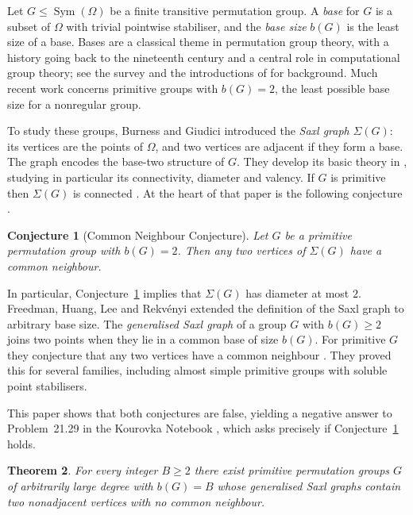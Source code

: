 \documentclass[a4paper,reqno,11pt]{amsart}
\newcommand\Symgrp{\operatorname{Sym}}
\newtheorem{thm}{Theorem}[section]
\newtheorem{conj}[thm]{Conjecture}
\numberwithin{equation}{section}
\begin{document}
Let $G\le\Symgrp(\Omega)$ be a finite transitive permutation group. A \emph{base} for $G$ is a subset of $\Omega$ with trivial pointwise stabiliser, and the \emph{base size} $b(G)$ is the least size of a base. Bases are a classical theme in permutation group theory, with a history going back to the nineteenth century and a central role in computational group theory; see the survey \cite{BC} and the introductions of \cite{BG,FHLR} for background. Much recent work concerns primitive groups with $b(G)=2$, the least possible base size for a nonregular group.

To study these groups, Burness and Giudici \cite{BG} introduced the \emph{Saxl graph} $\Sigma(G)$: its vertices are the points of $\Omega$, and two vertices are adjacent if they form a base. The graph encodes the base-two structure of $G$. They develop its basic theory in \cite{BG}, studying in particular its connectivity, diameter and valency. If $G$ is primitive then $\Sigma(G)$ is connected \cite[Lemma~2.1(ii)]{BG}. At the heart of that paper is the following conjecture \cite[Conjecture~4.5]{BG}.

\begin{conj}[Common Neighbour Conjecture]\label{bgconj}
Let $G$ be a primitive permutation group with $b(G)=2$. Then any two vertices of $\Sigma(G)$ have a common neighbour.
\end{conj}

In particular, Conjecture~\ref{bgconj} implies that $\Sigma(G)$ has diameter at most $2$. Freedman, Huang, Lee and Rekv\'enyi \cite{FHLR} extended the definition of the Saxl graph to arbitrary base size. The \emph{generalised Saxl graph} of a group $G$ with $b(G)\ge2$ joins two points when they lie in a common base of size $b(G)$. For primitive $G$ they conjecture that any two vertices have a common neighbour \cite[Conjecture~1.2]{FHLR}. They proved this for several families, including almost simple primitive groups with soluble point stabilisers.

This paper shows that both conjectures are false, yielding a negative answer to Problem~21.29 in the Kourovka Notebook \cite{KN}, which asks precisely if Conjecture~\ref{bgconj} holds.

\begin{thm}\label{mainthm}
For every integer $B\ge2$ there exist primitive permutation groups $G$ of arbitrarily large degree with $b(G)=B$ whose generalised Saxl graphs contain two nonadjacent vertices with no common neighbour.
\end{thm}
\end{document}
